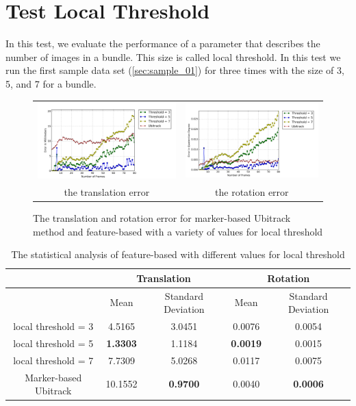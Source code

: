 \section{Test Local Threshold} \label{sec:local_threshold}
In this test, we evaluate the performance of a parameter that describes the number of images in a bundle. This size is called local threshold. In this test we run the first sample data set (\autoref{sec:sample_01}) for three times with the size of 3, 5, and 7 for a bundle.
\begin{figure}[H]
\centering
\begin{tabular}{cc}
  \includegraphics[width=80mm]{figures/local/graph_translation} &   \includegraphics[width=80mm]{figures/local/graph_rotation}  \\
  the translation error & the rotation error \\[6pt]
\end{tabular}
\caption{The translation and rotation error for marker-based Ubitrack method and feature-based with a variety of values for local threshold}\label{fig:test_local_threshold}
\end{figure}

\begin{table}[H]
\centering
  \begin{tabular}{| c || c | c | c | c |}
      \hline
      & \multicolumn{2}{c|}{Translation} & \multicolumn{2}{c|}{Rotation} \\ \hline
       & Mean & Standard Deviation & Mean & Standard Deviation \\ \hline
      local threshold = 3 & 4.5165 & 3.0451 & 0.0076 & 0.0054 \\ \hline
      local threshold = 5 & \textbf{1.3303} & 1.1184 & \textbf{0.0019} & 0.0015 \\ \hline
      local threshold = 7 & 7.7309 & 5.0268 & 0.0117 & 0.0075 \\ \hline
      Marker-based Ubitrack & 10.1552 & \textbf{0.9700} & 0.0040 & \textbf{0.0006} \\ \hline
  \end{tabular}
  \caption{The statistical analysis of feature-based with different values for local threshold} \label{tab:test_local_threshold}
\end{table}

